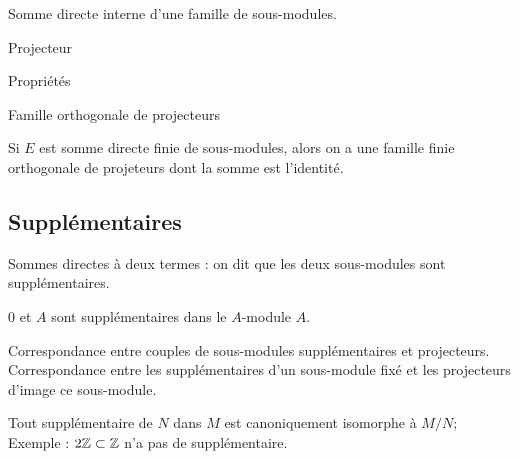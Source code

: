 \begin{definition} Somme directe interne d'une famille de sous-modules.
\end{definition}


\begin{definition} Projecteur\end{definition}

Propriétés

\begin{definition} Famille orthogonale de projecteurs\end{definition}

\begin{theoreme} Si $E$ est somme directe finie de sous-modules, alors on a une famille finie orthogonale de projeteurs dont la somme est l'identité.\end{theoreme}
\subsection{Supplémentaires}

\begin{definition} Sommes directes à deux termes : on dit que les deux sous-modules sont supplémentaires.\end{definition} 

$0$ et $A$ sont supplémentaires dans le $A$-module $A$.

Correspondance entre couples de sous-modules supplémentaires et projecteurs. Correspondance entre les supplémentaires d'un sous-module fixé et les projecteurs d'image ce sous-module.

Tout supplémentaire de $N$ dans $M$ est canoniquement isomorphe à $M/N$; Exemple  : $2\mathbb{Z} \subset \mathbb{Z}$ n'a pas de supplémentaire.
